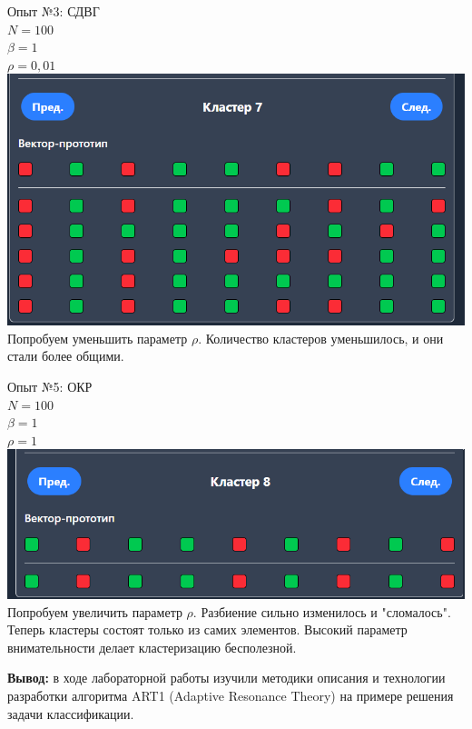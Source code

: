 \documentclass[a4paper,14pt]{extarticle}
\begin{document}
Опыт №3: СДВГ\\
$N = 100$\\
$\beta = 1$\\
$\rho = 0,01$\\
\includegraphics[width=140mm]{report3}\\
Попробуем уменьшить параметр $\rho$. Количество кластеров уменьшилось, и они стали более общими.\bigbreak

Опыт №5: ОКР\\
$N = 100$\\
$\beta = 1$\\
$\rho = 1$\\
\includegraphics[width=140mm]{report4}\\
Попробуем увеличить параметр $\rho$. Разбиение сильно изменилось и "сломалось". Теперь кластеры состоят только
из самих элементов. Высокий параметр внимательности делает кластеризацию бесполезной.\bigbreak


\textbf{Вывод: } в ходе лабораторной работы изучили методики описания и технологии разработки
алгоритма ART1 (Adaptive Resonance Theory) на примере решения задачи
классификации.
\end{document}
